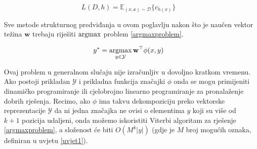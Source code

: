 \begin{equation} \label{funcloss}
  L(D, h) = \mathbb{E}_{(x, \mathbf{c}) \sim \mathcal{D}} \{c_{h(x)}\}
\end{equation}

Sve metode strukturnog predviđanja u ovom poglavlju nakon što je naučen vektor
težina $\mathbf{w}$ trebaju riješiti $\operatorname*{argmax}$ problem \ref{argmaxproblem}.

\begin{equation} \label{argmaxproblem}
  y\ssymbol{1} = \argmax_{y \in \mathcal{Y}} \mathbf{w}^\top \phi(x, y)
\end{equation}

Ovaj problem u generalnom slučaju nije izračunljiv u dovoljno kratkom vremenu.
Ako postoji prikladan $\mathcal{Y}$ i prikladna funkcija značajki $\phi$ onda se mogu primijeniti dinamičko programiranje  ili cjelobrojno linearno programiranje  za pronalaženje dobrih rješenja. Recimo, ako $\phi$ ima takvu dekompoziciju preko vektorske reprezentacije $\mathcal{Y}$ da ni jedna značajka ne ovisi o elementima $y$ koji su više od $k+1$ pozicija udaljeni, onda možemo iskoristiti Viterbi algoritam za rješenje \ref{argmaxproblem}, a složenost će biti $O(M^k |y|)$ (gdje je $M$ broj mogućih oznaka, definiran u uvjetu \ref{uvjet1}).
